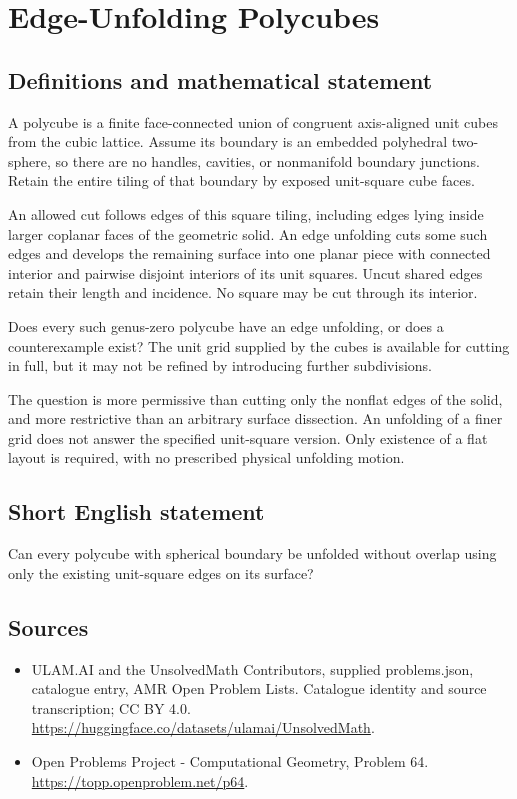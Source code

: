 \documentclass[11pt,a4paper]{article}
\begin{document}
\section*{Edge-Unfolding Polycubes}\label{statement}

\subsection{Definitions and mathematical statement}
A polycube is a finite face-connected union of congruent axis-aligned
unit cubes from the cubic lattice. Assume its boundary is an
embedded polyhedral two-sphere, so there are no handles, cavities,
or nonmanifold boundary junctions. Retain the entire tiling of
that boundary by exposed unit-square cube faces.

An allowed cut follows edges of this square tiling, including
edges lying inside larger coplanar faces of the geometric solid.
An edge unfolding cuts some such edges and develops the remaining
surface into one planar piece with connected interior and
pairwise disjoint interiors of its unit squares. Uncut shared
edges retain their length and incidence. No square may be cut
through its interior.

Does every such genus-zero polycube have an edge unfolding, or
does a counterexample exist? The unit grid supplied by the cubes
is available for cutting in full, but it may not be refined by
introducing further subdivisions.

The question is more permissive than cutting only the nonflat
edges of the solid, and more restrictive than an arbitrary
surface dissection. An unfolding of a finer grid does not answer
the specified unit-square version. Only existence of a flat
layout is required, with no prescribed physical unfolding motion.
\subsection{Short English statement}
Can every polycube with spherical boundary be unfolded without
overlap using only the existing unit-square edges on its surface?
\subsection{Sources}
\begin{itemize}
\item[S1] ULAM.AI and the UnsolvedMath Contributors, supplied problems.json, catalogue entry, AMR Open Problem Lists. Catalogue identity and source transcription; CC BY 4.0.
\url{https://huggingface.co/datasets/ulamai/UnsolvedMath}.
\item[S2] Open Problems Project - Computational Geometry, Problem 64. 
\url{https://topp.openproblem.net/p64}.
\end{itemize}
\end{document}
